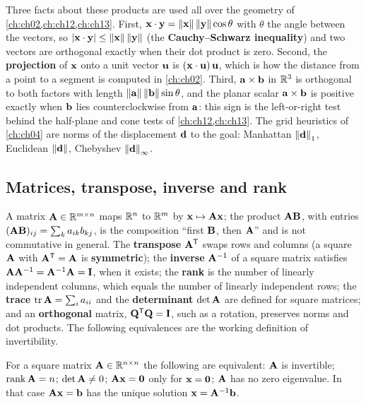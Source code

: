 Three facts about these products are used all over the geometry of
\cref{ch:ch02,ch:ch12,ch:ch13}. First, $\mathbf{x} \cdot \mathbf{y} = \left\lVert \mathbf{x} \right\rVert
\left\lVert \mathbf{y} \right\rVert \cos\theta$ with $\theta$ the angle between the vectors, so
$\left\lvert \mathbf{x} \cdot \mathbf{y} \right\rvert \le \left\lVert \mathbf{x} \right\rVert \left\lVert \mathbf{y} \right\rVert$ (the
\textbf{Cauchy--Schwarz inequality}) and two
vectors are orthogonal exactly when their dot product is zero. Second, the
\textbf{projection} of $\mathbf{x}$ onto a unit vector $\mathbf{u}$ is $(\mathbf{x}
\cdot \mathbf{u})\, \mathbf{u}$, which is how the distance from a point to a
segment is computed in \cref{ch:ch02}. Third, $\mathbf{a} \times \mathbf{b}$ in
$\mathbb{R}^3$ is orthogonal to both factors with length $\left\lVert \mathbf{a} \right\rVert
\left\lVert \mathbf{b} \right\rVert \sin\theta$, and the planar scalar $\mathbf{a} \times \mathbf{b}$
is positive exactly when $\mathbf{b}$ lies counterclockwise from $\mathbf{a}$:
this sign is the left-or-right test behind the half-plane and cone tests of
\cref{ch:ch12,ch:ch13}. The grid heuristics of \cref{ch:ch04} are norms of the
displacement $\mathbf{d}$ to the goal: Manhattan $\left\lVert \mathbf{d} \right\rVert_1$, Euclidean
$\left\lVert \mathbf{d} \right\rVert$, Chebyshev $\left\lVert \mathbf{d} \right\rVert_\infty$.

\subsection{Matrices, transpose, inverse and rank}

A matrix $\mathbf{A} \in \mathbb{R}^{m \times n}$ maps $\mathbb{R}^n$ to $\mathbb{R}^m$ by $\mathbf{x}
\mapsto \mathbf{A}\mathbf{x}$; the product $\mathbf{A}\mathbf{B}$, with entries
$(\mathbf{A}\mathbf{B})_{ij} = \sum_k a_{ik} b_{kj}$, is the composition ``first
$\mathbf{B}$, then $\mathbf{A}$'' and is not commutative in general. The
\textbf{transpose} $\mathbf{A}^{\mathsf{T}}$ swaps rows and columns
(a square $\mathbf{A}$ with $\mathbf{A}^{\mathsf{T}} = \mathbf{A}$ is \textbf{symmetric}); the
\textbf{inverse} $\mathbf{A}^{-1}$ of a square matrix
satisfies $\mathbf{A}\mathbf{A}^{-1} = \mathbf{A}^{-1}\mathbf{A} = \mathbf{I}$, when it exists;
the \textbf{rank} is the number of linearly independent
columns, which equals the number of linearly independent rows; the
\textbf{trace} $\operatorname{tr} \mathbf{A} = \sum_i a_{ii}$ and the \textbf{determinant}
$\det \mathbf{A}$ are defined for square matrices; and an \textbf{orthogonal}
matrix, $\mathbf{Q}^{\mathsf{T}}\mathbf{Q} = \mathbf{I}$, such as a rotation, preserves norms and
dot products. The following equivalences are the working definition of
invertibility.

\begin{proposition}[Invertibility]
\label{thm:appB-invertible}
For a square matrix $\mathbf{A} \in \mathbb{R}^{n \times n}$ the following are
equivalent: $\mathbf{A}$ is invertible; $\operatorname{rank} \mathbf{A} = n$;
$\det \mathbf{A} \ne 0$; $\mathbf{A}\mathbf{x} = \mathbf{0}$ only for $\mathbf{x} =
\mathbf{0}$; $\mathbf{A}$ has no zero eigenvalue. In that case
$\mathbf{A}\mathbf{x} = \mathbf{b}$ has the unique solution $\mathbf{x} =
\mathbf{A}^{-1}\mathbf{b}$.
\end{proposition}

